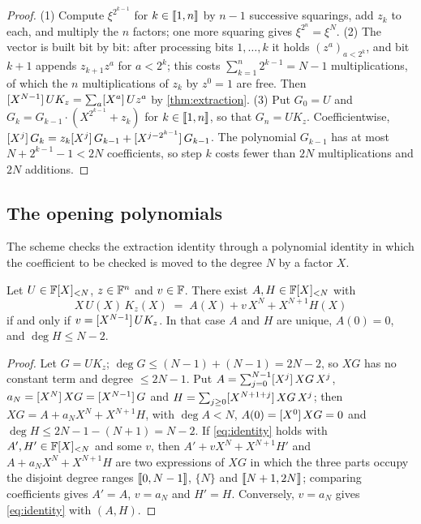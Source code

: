 \begin{proof}
(1) Compute $\xi^{2^{k-1}}$ for $k \in \llbracket 1, n \rrbracket$ by $n-1$ successive squarings, add $z_k$ to each, and multiply the $n$ factors; one more squaring gives $\xi^{2^n} = \xi^N$.
(2) The vector is built bit by bit: after processing bits $1, \dots, k$ it holds $(z^a)_{a < 2^k}$, and bit $k+1$ appends $z_{k+1} z^a$ for $a < 2^k$; this costs $\sum_{k=1}^{n} 2^{k-1} = N - 1$ multiplications, of which the $n$ multiplications of $z_{k}$ by $z^0 = 1$ are free. Then $[X^{N-1}]\,U K_z = \sum_a [X^{a}]\,U z^a$ by \cref{thm:extraction}.
(3) Put $G_0 = U$ and $G_k = G_{k-1} \cdot (X^{2^{k-1}} + z_k)$ for $k \in \llbracket 1, n \rrbracket$, so that $G_n = U K_z$. Coefficientwise, $[X^{j}]\,G_k = z_k [X^{j}]\,G_{k-1} + [X^{j - 2^{k-1}}]\,G_{k-1}$. The polynomial $G_{k-1}$ has at most $N + 2^{k-1} - 1 < 2N$ coefficients, so step $k$ costs fewer than $2N$ multiplications and $2N$ additions.
\end{proof}

\subsection{The opening polynomials}\label{sec:kernel:split}

The scheme checks the extraction identity through a polynomial identity in which the coefficient to be checked is moved to the degree $N$ by a factor $X$.

\begin{lemma}[Split]\label{lem:split}
Let $U \in \mathbb{F}[X]_{<N}$, $z \in \mathbb{F}^n$ and $v \in \mathbb{F}$. There exist $A, H \in \mathbb{F}[X]_{<N}$ with
\begin{equation}\label{eq:identity}
  X\, U(X)\, K_z(X) \;=\; A(X) + v\, X^N + X^{N+1} H(X)
\end{equation}
if and only if $v = [X^{N-1}]\,U K_z$. In that case $A$ and $H$ are unique, $A(0) = 0$, and $\deg H \le N-2$.
\end{lemma}

\begin{proof}
Let $G = U K_z$; $\deg G \le (N-1) + (N-1) = 2N-2$, so $XG$ has no constant term and degree $\le 2N-1$.
Put $A = \sum_{j=0}^{N-1} [X^{j}]\,XG\, X^j$, $a_N = [X^{N}]\,XG = [X^{N-1}]\,G$ and $H = \sum_{j \ge 0} [X^{N+1+j}]\,XG\, X^j$; then $XG = A + a_N X^N + X^{N+1} H$, with $\deg A < N$, $A(0) = [X^{0}]\,XG = 0$ and $\deg H \le 2N-1-(N+1) = N-2$.
If \eqref{eq:identity} holds with $A', H' \in \mathbb{F}[X]_{<N}$ and some $v$, then $A' + vX^N + X^{N+1}H'$ and $A + a_N X^N + X^{N+1} H$ are two expressions of $XG$ in which the three parts occupy the disjoint degree ranges $\llbracket 0, N-1 \rrbracket$, $\{N\}$ and $\llbracket N+1, 2N \rrbracket$; comparing coefficients gives $A' = A$, $v = a_N$ and $H' = H$. Conversely, $v = a_N$ gives \eqref{eq:identity} with $(A, H)$.
\end{proof}

